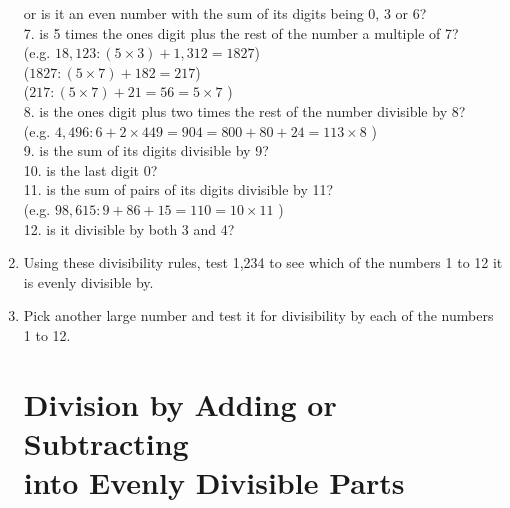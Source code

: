 \documentclass[12pt]{article}
\begin{document}
\begin{enumerate}
\hspace{2ex}or is it an even number with the sum of its digits being 0, 3 or 6?\\

7. is 5 times the ones digit plus the rest of the number a multiple of 7?\\

\hspace{2ex}(e.g. $18,123: (5 \times 3) + 1,312 = 1827$)\\

\hspace{2ex}($1827: (5 \times 7) + 182 = 217$)\\

\hspace{2ex}($217: (5 \times 7) + 21 = 56 = 5 \times 7$ \Checkmark)\\

8. is the ones digit plus two times the rest of the number divisible by 8?\\

\hspace{2ex}(e.g. $4,496: 6 + 2 \times 449 = 904 = 800 + 80 + 24 = 113 \times 8$ \Checkmark)\\

9. is the sum of its digits divisible by 9?\\

10. is the last digit 0?\\

11. is the sum of pairs of its digits divisible by 11?\\

\hspace{2ex}(e.g. $98,615: 9 + 86 + 15 = 110 = 10 \times 11$ \Checkmark)\\

12. is it divisible by both 3 and 4?\\

\item Using these divisibility rules, test 1,234 to see which of the numbers 1 to 12 it is evenly divisible by.
\item Pick another large number and test it for divisibility by each of the numbers 1 to 12.

\section*{Division by Adding or Subtracting\\into Evenly Divisible Parts}


\end{enumerate}
\end{document}

